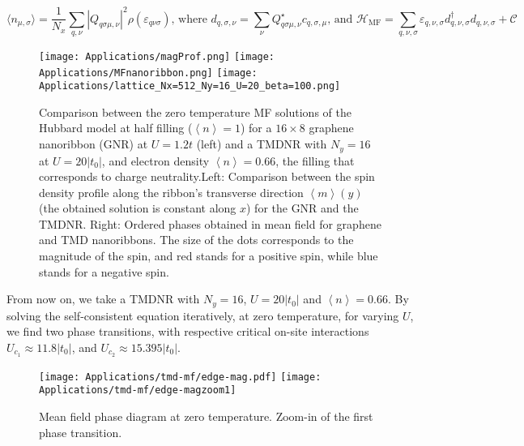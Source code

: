 \begin{equation}
\big\langle n_{\mu, \sigma} \big\rangle = \frac{1}{N_x}\sum_{q, \nu} | Q_{q \sigma \mu, \nu} |^2 \rho ( \varepsilon_{q \nu \sigma} ) , \, \text{where} \,\, d_{q, \sigma, \nu} = \sum_\nu Q_{q \sigma \mu, \nu}^\star c_{q ,\sigma, \mu} ,  \, \text{and} \,\, \mathcal{H}_{\text{MF}} = \sum_{q, \nu, \sigma} \varepsilon_{q, \nu, \sigma} d_{q, \nu, \sigma}^\dagger d_{q, \nu, \sigma} + \mathcal{C}
\end{equation}
\begin{figure}[H]
\texttt{[image: Applications/magProf.png]}
\hspace{0.9cm}
\texttt{[image: Applications/MFnanoribbon.png]}
\texttt{[image: Applications/lattice\_Nx=512\_Ny=16\_U=20\_beta=100.png]}
	\caption[Comparison between the zero temperature MF solutions of the Hubbard model for a graphene nanoribbon(GNR) and a \acs{TMDNR}]{Comparison between the zero temperature MF solutions of the Hubbard model at half filling ($\left\langle n \right\rangle = 1$) for a $16 \times 8$ graphene nanoribbon (GNR) at $U=1.2t$ (left) and a \acs{TMDNR} with $N_y = 16$ at $U = 20| t_0 |$, and electron density $\left\langle n \right\rangle = 0.66$, the filling that corresponds to charge neutrality.Left: Comparison between the spin density profile along the ribbon's transverse direction $\left\langle m \right\rangle (y)$ (the obtained solution is constant along $x$) for the GNR and the \acs{TMDNR}.
Right: Ordered phases obtained in mean field for graphene and \ac{TMD} nanoribbons. 
The size of the dots corresponds to the magnitude of the spin, and red stands for a positive spin, while blue stands for a negative spin.}
	\label{fig:nanoGraphVsTMD}
\end{figure}
From now on, we take a \acs{TMDNR} with $N_y = 16$, $U = 20| t_0 |$ and $\left\langle n \right\rangle = 0.66$.
By solving the self-consistent equation iteratively, at zero temperature, for varying $U$, we find two phase transitions, with respective critical on-site interactions $U_{c_1} \approx 11.8 |t_0|$, and $U_{c_2} \approx 15.395 |t_0|$.
\begin{figure}[H]
\texttt{[image: Applications/tmd-mf/edge-mag.pdf]}
\hspace{0.5cm}
\texttt{[image: Applications/tmd-mf/edge-magzoom1]}
	\caption[Mean field phase diagram at zero temperature. Zoom-in of the first phase transition.]{Mean field phase diagram at zero temperature. Zoom-in of the first phase transition.
	\label{fig:zeroTphaseDiagram}}
\end{figure}

